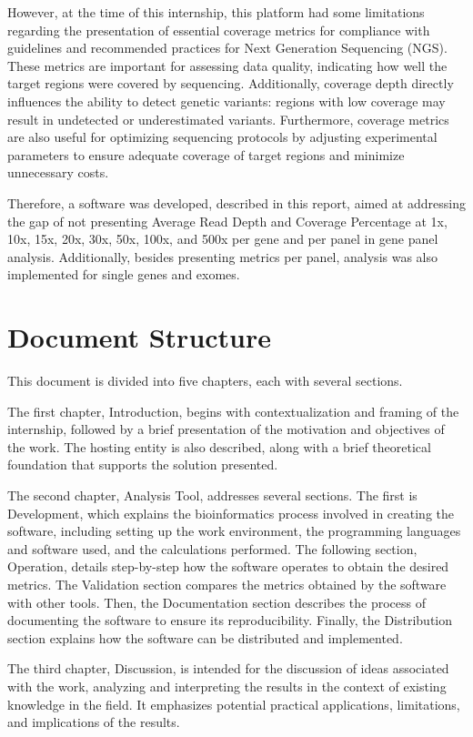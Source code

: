 However, at the time of this internship, this platform had some limitations regarding the presentation of essential coverage metrics for compliance with guidelines and recommended practices for Next Generation Sequencing (NGS). These metrics are important for assessing data quality, indicating how well the target regions were covered by sequencing. Additionally, coverage depth directly influences the ability to detect genetic variants: regions with low coverage may result in undetected or underestimated variants. Furthermore, coverage metrics are also useful for optimizing sequencing protocols by adjusting experimental parameters to ensure adequate coverage of target regions and minimize unnecessary costs.

Therefore, a software was developed, described in this report, aimed at addressing the gap of not presenting Average Read Depth and Coverage Percentage at 1x, 10x, 15x, 20x, 30x, 50x, 100x, and 500x per gene and per panel in gene panel analysis. Additionally, besides presenting metrics per panel, analysis was also implemented for single genes and exomes.

\section{Document Structure}
This document is divided into five chapters, each with several sections.

The first chapter, Introduction, begins with contextualization and framing of the internship, followed by a brief presentation of the motivation and objectives of the work. The hosting entity is also described, along with a brief theoretical foundation that supports the solution presented.

The second chapter, Analysis Tool, addresses several sections. The first is Development, which explains the bioinformatics process involved in creating the software, including setting up the work environment, the programming languages and software used, and the calculations performed. The following section, Operation, details step-by-step how the software operates to obtain the desired metrics. The Validation section compares the metrics obtained by the software with other tools. Then, the Documentation section describes the process of documenting the software to ensure its reproducibility. Finally, the Distribution section explains how the software can be distributed and implemented.

The third chapter, Discussion, is intended for the discussion of ideas associated with the work, analyzing and interpreting the results in the context of existing knowledge in the field. It emphasizes potential practical applications, limitations, and implications of the results.


